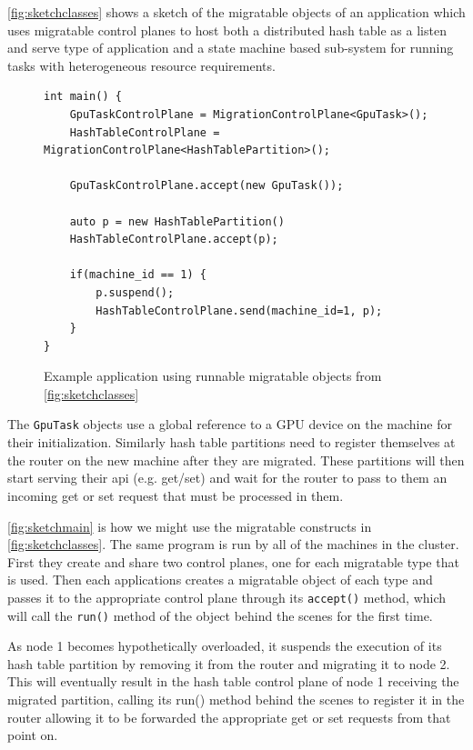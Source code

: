 \autoref{fig:sketchclasses} shows a sketch of the migratable objects of
an application which uses migratable control planes to
host both a distributed hash table as a listen and serve type of
application and a state machine based sub-system for running tasks with
heterogeneous resource requirements.

\begin{figure}[tp]
\begin{lstlisting}
int main() {
    GpuTaskControlPlane = MigrationControlPlane<GpuTask>();
    HashTableControlPlane = MigrationControlPlane<HashTablePartition>();

    GpuTaskControlPlane.accept(new GpuTask());

    auto p = new HashTablePartition()
    HashTableControlPlane.accept(p);

    if(machine_id == 1) {
        p.suspend();
        HashTableControlPlane.send(machine_id=1, p);
    }
}
\end{lstlisting}
\caption{
    Example application using runnable migratable objects from \autoref{fig:sketchclasses}
}
\label{fig:sketchmain}
\end{figure}

The \texttt{GpuTask} objects
use a global reference to a GPU device on the machine for their
initialization. Similarly hash table partitions need to register
themselves at the router on the new machine after they are migrated. These
partitions will then start serving their api (e.g. get/set) and wait for
the router to pass to them an incoming get or set request that must be
processed in them.




\autoref{fig:sketchmain} is how we might use the migratable constructs in
\autoref{fig:sketchclasses}. The same program
is run by all of the machines in the cluster. First they create and share
two control planes, one for each migratable type that is used.
Then each applications creates a migratable object of each type and passes
it to the appropriate control plane through its \texttt{accept()} method,
which will call the \texttt{run()} method of the object behind the scenes
for the first time.

As node 1 becomes hypothetically overloaded, it suspends the execution of
    its hash table partition by removing it from the router
    and migrating it to node 2. This will eventually result in the hash table
    control plane of node 1 receiving the migrated partition, calling its
    run() method behind the scenes to register it in the router allowing
    it to be forwarded the appropriate get or set requests from that
    point on.

